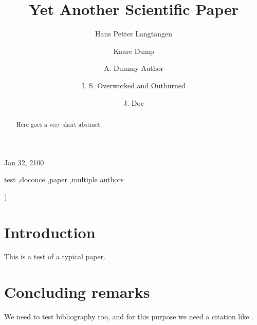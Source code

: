 \documentclass[final]{elsarticle}
\begin{document}

\newcommand{\exercisesection}[1]{\subsection*{#1}}








\begin{frontmatter}

\title{Yet Another Scientific Paper}


\author[inst1,inst2]{Hans Petter Langtangen}
\author[inst3]{Kaare Dump}
\author[]{A. Dummy Author}
\author[inst4,inst5,inst6,inst7]{I. S. Overworked and Outburned}
\author[]{J. Doe}\address[inst1]{Center for Biomedical Computing, Simula Research Laboratory}
\address[inst2]{Department of Informatics, University of Oslo}
\address[inst3]{Segfault, Cyberspace}
\address[inst4]{Inst1}
\address[inst5]{Inst2, Somewhere}
\address[inst6]{Third Inst, Elsewhere}
\address[inst7]{Fourth Inst}


\begin{center}
Jan 32, 2100
\end{center}

\vspace{1cm}

\begin{abstract}
Here goes
a very short
abstract.
\end{abstract}


\begin{keyword}
test \sep doconce \sep paper \sep multiple authors
\end{keyword}

\end{frontmatter}

)


\vspace{1cm} %

\section{Introduction}

This is a test of a typical paper.

\section{Concluding remarks}

We need to test bibliography too, and for this purpose we need
a citation like \cite{Langtangen_1992c,Langtangen_1994a}.





\end{document}
